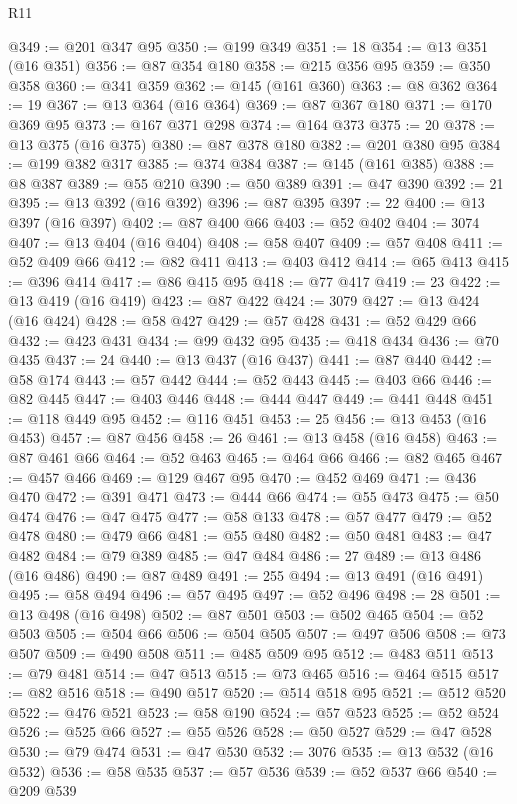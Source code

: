 \begin{lexlean}{R11}
\begin{coremodule}
@349 := @201 @347 @95
@350 := @199 @349
@351 := 18
@354 := @13 @351 (@16 @351)
@356 := @87 @354 @180
@358 := @215 @356 @95
@359 := @350 @358
@360 := @341 @359
@362 := @145 (@161 @360)
@363 := @8 @362
@364 := 19
@367 := @13 @364 (@16 @364)
@369 := @87 @367 @180
@371 := @170 @369 @95
@373 := @167 @371 @298
@374 := @164 @373
@375 := 20
@378 := @13 @375 (@16 @375)
@380 := @87 @378 @180
@382 := @201 @380 @95
@384 := @199 @382 @317
@385 := @374 @384
@387 := @145 (@161 @385)
@388 := @8 @387
@389 := @55 @210
@390 := @50 @389
@391 := @47 @390
@392 := 21
@395 := @13 @392 (@16 @392)
@396 := @87 @395
@397 := 22
@400 := @13 @397 (@16 @397)
@402 := @87 @400 @66
@403 := @52 @402
@404 := 3074
@407 := @13 @404 (@16 @404)
@408 := @58 @407
@409 := @57 @408
@411 := @52 @409 @66
@412 := @82 @411
@413 := @403 @412
@414 := @65 @413
@415 := @396 @414
@417 := @86 @415 @95
@418 := @77 @417
@419 := 23
@422 := @13 @419 (@16 @419)
@423 := @87 @422
@424 := 3079
@427 := @13 @424 (@16 @424)
@428 := @58 @427
@429 := @57 @428
@431 := @52 @429 @66
@432 := @423 @431
@434 := @99 @432 @95
@435 := @418 @434
@436 := @70 @435
@437 := 24
@440 := @13 @437 (@16 @437)
@441 := @87 @440
@442 := @58 @174
@443 := @57 @442
@444 := @52 @443
@445 := @403 @66
@446 := @82 @445
@447 := @403 @446
@448 := @444 @447
@449 := @441 @448
@451 := @118 @449 @95
@452 := @116 @451
@453 := 25
@456 := @13 @453 (@16 @453)
@457 := @87 @456
@458 := 26
@461 := @13 @458 (@16 @458)
@463 := @87 @461 @66
@464 := @52 @463
@465 := @464 @66
@466 := @82 @465
@467 := @457 @466
@469 := @129 @467 @95
@470 := @452 @469
@471 := @436 @470
@472 := @391 @471
@473 := @444 @66
@474 := @55 @473
@475 := @50 @474
@476 := @47 @475
@477 := @58 @133
@478 := @57 @477
@479 := @52 @478
@480 := @479 @66
@481 := @55 @480
@482 := @50 @481
@483 := @47 @482
@484 := @79 @389
@485 := @47 @484
@486 := 27
@489 := @13 @486 (@16 @486)
@490 := @87 @489
@491 := 255
@494 := @13 @491 (@16 @491)
@495 := @58 @494
@496 := @57 @495
@497 := @52 @496
@498 := 28
@501 := @13 @498 (@16 @498)
@502 := @87 @501
@503 := @502 @465
@504 := @52 @503
@505 := @504 @66
@506 := @504 @505
@507 := @497 @506
@508 := @73 @507
@509 := @490 @508
@511 := @485 @509 @95
@512 := @483 @511
@513 := @79 @481
@514 := @47 @513
@515 := @73 @465
@516 := @464 @515
@517 := @82 @516
@518 := @490 @517
@520 := @514 @518 @95
@521 := @512 @520
@522 := @476 @521
@523 := @58 @190
@524 := @57 @523
@525 := @52 @524
@526 := @525 @66
@527 := @55 @526
@528 := @50 @527
@529 := @47 @528
@530 := @79 @474
@531 := @47 @530
@532 := 3076
@535 := @13 @532 (@16 @532)
@536 := @58 @535
@537 := @57 @536
@539 := @52 @537 @66
@540 := @209 @539

\end{coremodule}
\end{lexlean}
